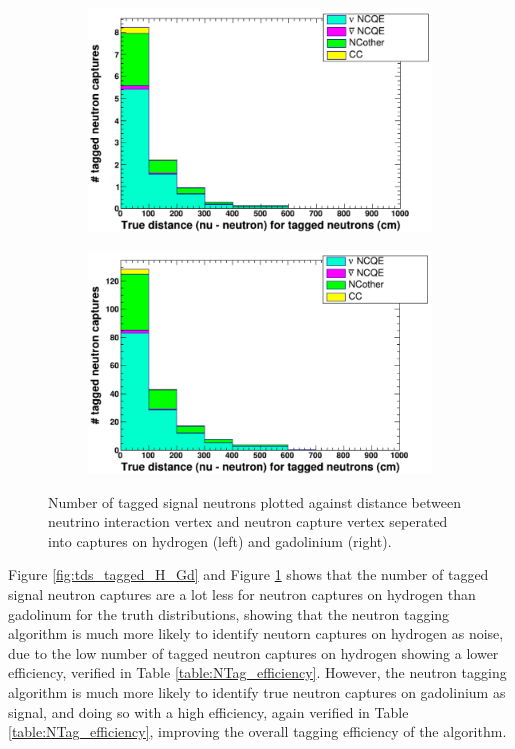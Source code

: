 \begin{figure}
    \centering
     \begin{subfigure}[b]{0.49\linewidth}
      \includegraphics[width=\linewidth]{Figures/distposvtrunvx_tagged_neutrons_H.PNG}
     \end{subfigure}
     \begin{subfigure}[b]{0.49\linewidth}
       \includegraphics[width=\linewidth]{Figures/distposvtrunvx_tagged_neutrons_Gd.PNG}
      \end{subfigure} 
      \caption{Number of tagged signal neutrons plotted against distance between neutrino interaction vertex and neutron capture vertex seperated into captures on hydrogen (left) and gadolinium (right).}
      \label{fig:distposvtrunvx_tagged_H_Gd} 
\end{figure}

Figure \ref{fig:tds_tagged_H_Gd} and Figure \ref{fig:distposvtrunvx_tagged_H_Gd} shows that the number of tagged signal neutron captures are a lot less for neutron captures on hydrogen than gadolinum for the truth distributions, showing that the neutron tagging algorithm is much more likely to identify neutorn captures on hydrogen as noise, due to the low number of tagged neutron captures on hydrogen showing a lower efficiency, verified in Table \ref{table:NTag_efficiency}. However, the neutron tagging algorithm is much more likely to identify true neutron captures on gadolinium as signal, and doing so with a high efficiency, again verified in Table \ref{table:NTag_efficiency}, improving the overall tagging efficiency of the algorithm. 

